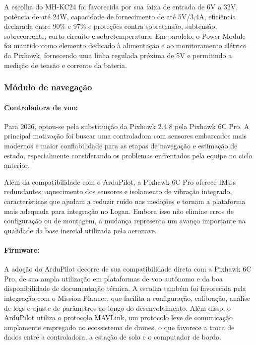 A escolha do MH-KC24 foi favorecida por sua faixa de entrada de 6V a 32V, potência de até 24W, capacidade de fornecimento de até 5V/3,4A, eficiência declarada entre 90\% e 97\% e proteções contra sobretensão, subtensão, sobrecorrente, curto-circuito e sobretemperatura. Em paralelo, o Power Module foi mantido como elemento dedicado à alimentação e ao monitoramento elétrico da Pixhawk, fornecendo uma linha regulada próxima de 5V e permitindo a medição de tensão e corrente da bateria.

\subsubsection{Módulo de navegação}

\paragraph{Controladora de voo:}
Para 2026, optou-se pela substituição da Pixhawk 2.4.8 pela Pixhawk 6C Pro. A principal motivação foi buscar uma controladora com sensores embarcados mais modernos e maior confiabilidade para as etapas de navegação e estimação de estado, especialmente considerando os problemas enfrentados pela equipe no ciclo anterior.

Além da compatibilidade com o ArduPilot, a Pixhawk 6C Pro oferece IMUs redundantes, aquecimento dos sensores e isolamento de vibração integrado, características que ajudam a reduzir ruído nas medições e tornam a plataforma mais adequada para integração no Logan. Embora isso não elimine erros de configuração ou de montagem, a mudança representa um avanço importante na qualidade da base inercial utilizada pela aeronave.

\paragraph{Firmware:}
A adoção do ArduPilot decorre de sua compatibilidade direta com a Pixhawk 6C Pro, de sua ampla utilização em plataformas de voo autônomo e da boa disponibilidade de documentação técnica. A escolha também foi favorecida pela integração com o Mission Planner, que facilita a configuração, calibração, análise de logs e ajuste de parâmetros ao longo do desenvolvimento. Além disso, o ArduPilot utiliza o protocolo MAVLink, um protocolo leve de comunicação amplamente empregado no ecossistema de drones, o que favorece a troca de dados entre a controladora, a estação de solo e o computador de bordo.


